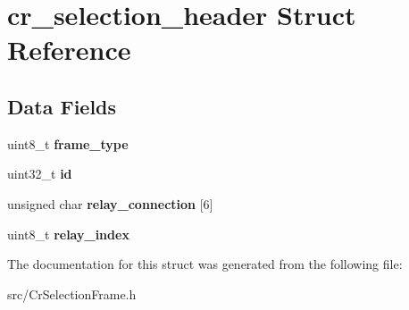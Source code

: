 \hypertarget{structcr__selection__header}{\section{cr\-\_\-selection\-\_\-header Struct Reference}
\label{structcr__selection__header}
}
\subsection*{Data Fields}
\begin{DoxyCompactItemize}
\item 
\hypertarget{structcr__selection__header_accf13e0ce4578dee3e4fc0e3fd18c4b3}{uint8\-\_\-t {\bfseries frame\-\_\-type}}\label{structcr__selection__header_accf13e0ce4578dee3e4fc0e3fd18c4b3}

\item 
\hypertarget{structcr__selection__header_a2915f582743e48f0fbdbe4e08b404c2e}{uint32\-\_\-t {\bfseries id}}\label{structcr__selection__header_a2915f582743e48f0fbdbe4e08b404c2e}

\item 
\hypertarget{structcr__selection__header_a2ae092e9130f7a35b48a2a32872cc217}{unsigned char {\bfseries relay\-\_\-connection} \mbox{[}6\mbox{]}}\label{structcr__selection__header_a2ae092e9130f7a35b48a2a32872cc217}

\item 
\hypertarget{structcr__selection__header_a314446313c5b64c3b329c725758fe557}{uint8\-\_\-t {\bfseries relay\-\_\-index}}\label{structcr__selection__header_a314446313c5b64c3b329c725758fe557}

\end{DoxyCompactItemize}


The documentation for this struct was generated from the following file\-:\begin{DoxyCompactItemize}
\item 
src/Cr\-Selection\-Frame.\-h\end{DoxyCompactItemize}
